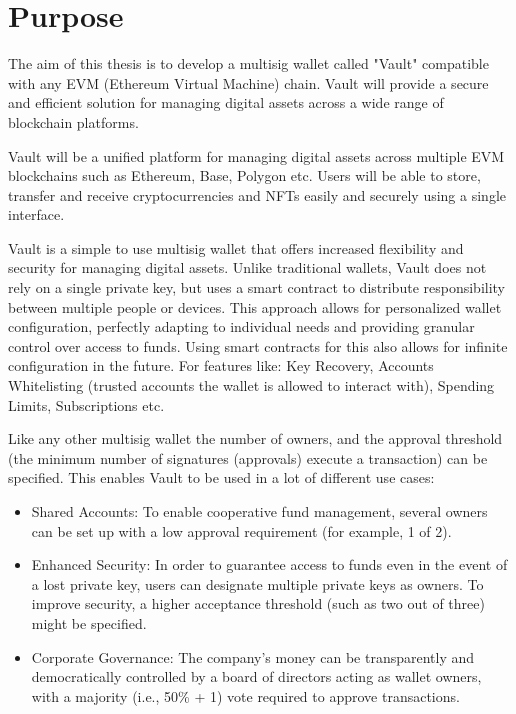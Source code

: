 \section{Purpose}
\label{sec:ch1sec2}

\par The aim of this thesis is to develop a multisig wallet called "Vault" compatible with any EVM (Ethereum Virtual Machine) chain. Vault will provide a secure and efficient solution for managing digital assets across a wide range of blockchain platforms.
\par Vault will be a unified platform for managing digital assets across multiple EVM blockchains such as Ethereum, Base, Polygon etc. Users will be able to store, transfer and receive cryptocurrencies and NFTs easily and securely using a single interface. 
\par Vault is a simple to use multisig wallet that offers increased flexibility and security for managing digital assets. Unlike traditional wallets, Vault does not rely on a single private key, but uses a smart contract to distribute responsibility between multiple people or devices. This approach allows for personalized wallet configuration, perfectly adapting to individual needs and providing granular control over access to funds. Using smart contracts for this also allows for infinite configuration in the future. For features like: Key Recovery, Accounts Whitelisting (trusted accounts the wallet is allowed to interact with), Spending Limits, Subscriptions etc. 
\par Like any other multisig wallet the number of owners, and the approval threshold (the minimum number of signatures (approvals) execute a transaction) can be specified. This enables Vault to be used in a lot of different use cases:
\begin{itemize}
\item Shared Accounts: To enable cooperative fund management, several owners can be set up with a low approval requirement (for example, 1 of 2).
\item Enhanced Security: In order to guarantee access to funds even in the event of a lost private key, users can designate multiple private keys as owners. To improve security, a higher acceptance threshold (such as two out of three) might be specified.
\item Corporate Governance: The company's money can be transparently and democratically controlled by a board of directors acting as wallet owners, with a majority (i.e., 50\% + 1) vote required to approve transactions.
\end{itemize}

